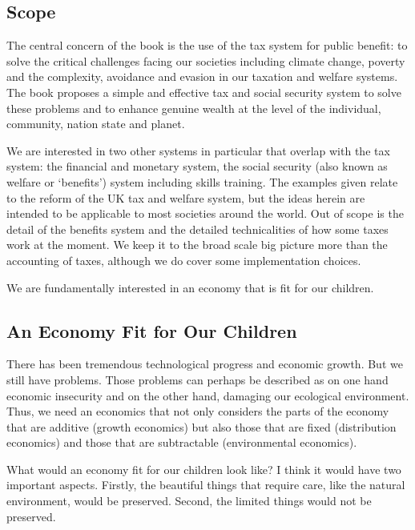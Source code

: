 \documentclass[]{tufte-handout}
\begin{document}
\hypertarget{scope}{%
\subsection{Scope}\label{scope}}

The central concern of the book is the use of the tax system for public
benefit: to solve the critical challenges facing our societies including
climate change, poverty and the complexity, avoidance and evasion in our
taxation and welfare systems. The book proposes a simple and effective
tax and social security system to solve these problems and to enhance
genuine wealth at the level of the individual, community, nation state
and planet.

We are interested in two other systems in particular that overlap with
the tax system: the financial and monetary system, the social security
(also known as welfare or `benefits') system including skills training.
The examples given relate to the reform of the UK tax and welfare
system, but the ideas herein are intended to be applicable to most
societies around the world. Out of scope is the detail of the benefits
system and the detailed technicalities of how some taxes work at the
moment. We keep it to the broad scale big picture more than the
accounting of taxes, although we do cover some implementation choices.

We are fundamentally interested in an economy that is fit for our
children.

\hypertarget{an-economy-fit-for-our-children}{%
\subsection{An Economy Fit for Our
Children}\label{an-economy-fit-for-our-children}}

There has been tremendous technological progress and economic growth.
But we still have problems. Those problems can perhaps be described as
on one hand economic insecurity and on the other hand, damaging our
ecological environment. Thus, we need an economics that not only
considers the parts of the economy that are additive (growth economics)
but also those that are fixed (distribution economics) and those that
are subtractable (environmental economics).

What would an economy fit for our children look like? I think it would
have two important aspects. Firstly, the beautiful things that require
care, like the natural environment, would be preserved. Second, the
limited things would not be preserved.
\end{document}
